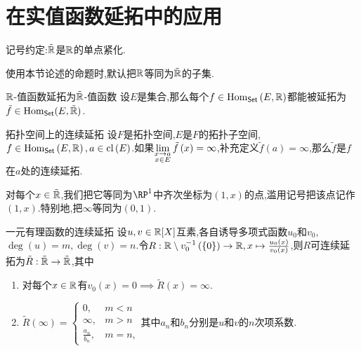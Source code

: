 \section{在实值函数延拓中的应用}

记号约定:$\tilde{\mathbb{R}}$是$\mathbb{R}$的单点紧化.

\begin{convention}{}{}
	使用本节论述的命题时,默认把$\mathbb{R}$等同为$\tilde{\mathbb{R}}$的子集.
\end{convention}

\begin{convention}{$\mathbb{R}$-值函数延拓为$\tilde{\mathbb{R}}$-值函数}{}
	设$E$是集合,那么每个$f\in\operatorname{Hom}_{\mathsf{Set}}\left(E,\mathbb{R}\right)$都能被延拓为$\tilde{f}\in\operatorname{Hom}_{\mathsf{Set}}(E,\tilde{\mathbb{R}})$.
\end{convention}

\begin{proposition}{拓扑空间上的连续延拓}{}
	设$F$是拓扑空间,$E$是$F$的拓扑子空间,$f\in\operatorname{Hom}_{\mathsf{Set}}\left(E,\mathbb{R}\right),a\in\operatorname{cl}\left(E\right)$.如果$\displaystyle\lim_{\substack{x\to a\\ x\in E}}\tilde{f}\left(x\right)=\infty$,补充定义$\tilde{f}\left(a\right)=\infty$,那么$\tilde{f}$是$f$在$a$处的连续延拓.
\end{proposition}

\begin{convention}{}{}
	对每个$x\in\tilde{\mathbb{R}}$,我们把它等同为$\RP^{1}$中齐次坐标为$\left(1,x\right)$的点,滥用记号把该点记作$\left(1,x\right)$.特别地,把$\infty$等同为$\left(0,1\right)$.
\end{convention}

\begin{proposition}{一元有理函数的连续延拓}{}
	设$u,v\in\mathbb{R}[X]$互素,各自诱导多项式函数$u_{0}$和$v_{0}$,$\deg\left(u\right)=m,\deg\left(v\right)=n$.令$R:\mathbb{R}\setminus v_{0}^{-1}\left(\left\{0\right\}\right)\to\mathbb{R},x\mapsto\frac{u_{0}\left(x\right)}{v_{0}\left(x\right)}$,则$R$可连续延拓为$\tilde{R}:\tilde{\mathbb{R}}\to\tilde{\mathbb{R}}$,其中
	\begin{enumerate}
		\item 对每个$x\in\mathbb{R}$有$v_{0}\left(x\right)=0\implies\tilde{R}\left(x\right)=\infty$.
		\item $\tilde{R}\left(\infty\right)=
		\begin{cases}
			0,&m<n\\
			\infty,&m>n\\
			\frac{a_{n}}{b_{n}},&m=n,
		\end{cases}$其中$a_{n}$和$b_{n}$分别是$u$和$v$的$n$次项系数.
	\end{enumerate}
\end{proposition}

